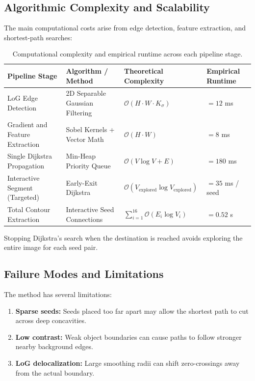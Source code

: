 \documentclass[11pt,a4paper]{article}
\begin{document}
\subsection{Algorithmic Complexity and Scalability}

The main computational costs arise from edge detection, feature extraction, and shortest-path searches:
\begin{table}[H]
\centering
\small
\setlength{\tabcolsep}{4pt}
\renewcommand{\arraystretch}{1.3}

\begin{tabularx}{\textwidth}{
    >{\raggedright\arraybackslash}p{}
    >{\centering\arraybackslash}p{}
    >{\centering\arraybackslash}p{}
    >{\centering\arraybackslash}X
}
\toprule
\textbf{Pipeline Stage} &
\textbf{Algorithm / Method} &
\textbf{Theoretical Complexity} &
\textbf{Empirical Runtime} \\
\midrule

LoG Edge Detection
& 2D Separable Gaussian Filtering
& $\mathcal{O}(H \cdot W \cdot K_\sigma)$
& $= 12$ ms \\

Gradient and Feature Extraction
& Sobel Kernels + Vector Math
& $\mathcal{O}(H \cdot W)$
& $= 8$ ms \\

Single Dijkstra Propagation
& Min-Heap Priority Queue
& $\mathcal{O}(V \log V + E)$
& $= 180$ ms \\

Interactive Segment (Targeted)
& Early-Exit Dijkstra
& $\mathcal{O}(V_{\text{explored}} \log V_{\text{explored}})$
& $= 35$ ms / seed \\

Total Contour Extraction
& 16 Interactive Seed Connections
& $\sum_{i=1}^{16} \mathcal{O}(E_i \log V_i)$
& $= 0.52$ s \\

\bottomrule
\end{tabularx}

\caption{Computational complexity and empirical runtime across each pipeline stage.}
\label{tab:runtime}
\end{table}

Stopping Dijkstra's search when the destination is reached avoids exploring the entire image for each seed pair.

\subsection{Failure Modes and Limitations}

The method has several limitations:
\begin{enumerate}
    \item \textbf{Sparse seeds:} Seeds placed too far apart may allow the shortest path to cut across deep concavities.
    \item \textbf{Low contrast:} Weak object boundaries can cause paths to follow stronger nearby background edges.
    \item \textbf{LoG delocalization:} Large smoothing radii can shift zero-crossings away from the actual boundary.
\end{enumerate}
\end{document}

